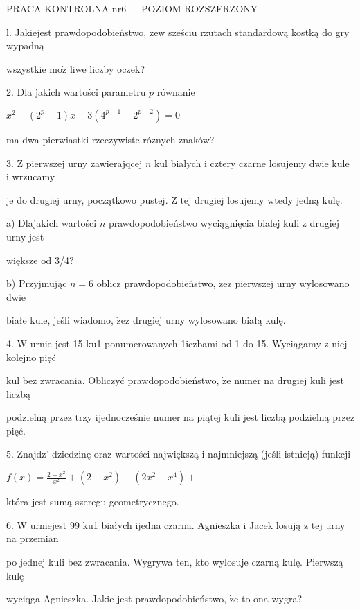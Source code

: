 \documentclass[a4paper,12pt]{article}
\begin{document}
PRACA KONTROLNA $\mathrm{n}\mathrm{r} 6-$ POZIOM ROZSZERZONY

l. Jakiejest prawdopodobieństwo, $\dot{\mathrm{z}}\mathrm{e}\mathrm{w}$ sześciu rzutach standardową kostką do gry wypadną

wszystkie $\mathrm{m}\mathrm{o}\dot{\mathrm{z}}$ liwe liczby oczek?

2. Dla jakich wartości parametru $p$ równanie

$x^{2}-(2^{p}-1)x-3(4^{p-1}-2^{p-2})=0$

ma dwa pierwiastki rzeczywiste róznych znaków?

3. $\mathrm{Z}$ pierwszej urny zawierajqcej $n$ kul bialych $\mathrm{i}$ cztery czarne losujemy dwie kule $\mathrm{i}$ wrzucamy

je do drugiej urny, początkowo pustej. $\mathrm{Z}$ tej drugiej losujemy wtedy jedną kulę.

a) Dlajakich wartości $n$ prawdopodobieństwo wyciągnięcia bialej kuli $\mathrm{z}$ drugiej urny jest

większe od 3/4?

b) Przyjmując $n=6$ oblicz prawdopodobieństwo, $\dot{\mathrm{z}}\mathrm{e}\mathrm{z}$ pierwszej urny wylosowano dwie

białe kule, ješli wiadomo, $\dot{\mathrm{z}}\mathrm{e}\mathrm{z}$ drugiej urny wylosowano białą kulę.

4. $\mathrm{W}$ urnie jest 15 ku1 ponumerowanych 1iczbami od 1 do 15. Wyciągamy $\mathrm{z}$ niej kolejno pięć

kul bez zwracania. Obliczyć prawdopodobieństwo, $\dot{\mathrm{z}}\mathrm{e}$ numer na drugiej kuli jest liczbą

podzielną przez trzy ijednocześnie numer na piątej kuli jest liczbą podzielną przez pięć.

5. Znajdz' dziedzinę oraz wartości największą $\mathrm{i}$ najmniejszą (ješli istnieją) funkcji

$f(x)=\displaystyle \frac{2-x^{2}}{x^{2}}+(2-x^{2})+(2x^{2}-x^{4})+$

która jest sumą szeregu geometrycznego.

6. $\mathrm{W}$ urniejest 99 ku1 białych ijedna czarna. Agnieszka $\mathrm{i}$ Jacek losują $\mathrm{z}$ tej urny na przemian

po jednej kuli bez zwracania. Wygrywa ten, kto wylosuje czarną kulę. Pierwszą kulę

wyciqga Agnieszka. Jakie jest prawdopodobieństwo, $\dot{\mathrm{z}}\mathrm{e}$ to ona wygra?
\end{document}
